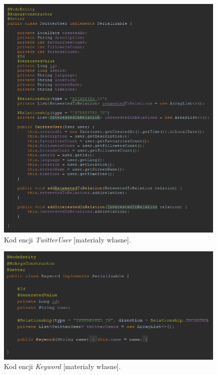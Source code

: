 \begin{figure}[h] %
	\centering
	\includegraphics[width=1.0\linewidth]{img/twitter_analyser_twitter_user}
	\caption{Kod encji \textit{TwitterUser} [materiały własne].}
\end{figure}

\begin{figure}[h] %
	\centering
	\includegraphics[width=1.0\linewidth]{img/twitter_analyser_keyword}
	\caption{Kod encji \textit{Keyword} [materiały własne].}
\end{figure}

